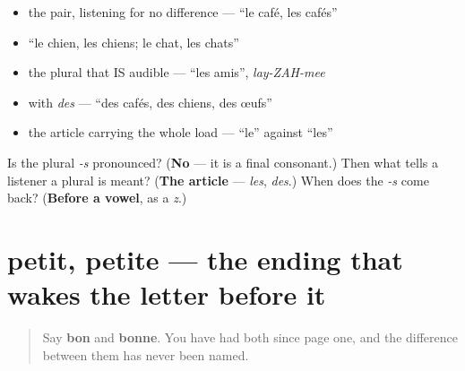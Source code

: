 \begin{itemize}
\raggedright
  \item the pair, listening for no difference — \textquotedblleft{}le café, les cafés\textquotedblright{}
  \item \textquotedblleft{}le chien, les chiens; le chat, les chats\textquotedblright{}
  \item the plural that IS audible — \textquotedblleft{}les amis\textquotedblright{}, \emph{lay-ZAH-mee}
  \item with \emph{des} — \textquotedblleft{}des cafés, des chiens, des œufs\textquotedblright{}
  \item the article carrying the whole load — \textquotedblleft{}le\textquotedblright{} against \textquotedblleft{}les\textquotedblright{}
\end{itemize}

\begin{tcolorbox}[breakable,colback=teal!4,colframe=teal!35!black,title={Before you move on}]
Is the plural \emph{-s} pronounced? (\textbf{No} — it is a final consonant.) Then what tells a listener a plural is meant? (\textbf{The article} — \emph{les}, \emph{des}.) When does the \emph{-s} come back? (\textbf{Before a vowel}, as a \emph{z}.)
\end{tcolorbox}
\section[petit, petite]{petit, petite — the ending that wakes the letter before it}

\label{lesson:FR-C38-feminin-e}



\begin{quote}
Say \textbf{bon} and \textbf{bonne}. You have had both since page one, and the difference between them has never been named.
\end{quote}

